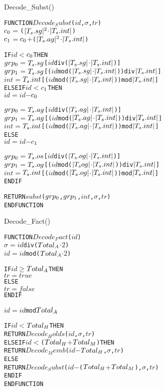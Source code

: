 \documentclass[11pt]{report}
\newenvironment{vverbatim}
{
  \begin{alltt}
}
{
    \vspace{-\baselineskip}
  \end{alltt}
}
\newlength{\valgorithmboxwidth}
\newenvironment{valgorithm}[3][tbhp]
{
  \setlength{\valgorithmboxwidth}{\linewidth-2em}

  \begin{valgorithmfloat}[#1]
    \caption{#2}
    \label{#3}
    \hspace{1em}
    \begin{lrbox}{\valgorithmbox}
      \begin{minipage}[l]{\valgorithmboxwidth}
        \small
        \begin{vverbatim}
}
{
        \end{vverbatim}
      \end{minipage}
    \end{lrbox}
    \framebox[\valgorithmboxwidth][l]{\usebox{\valgorithmbox}}
  \end{valgorithmfloat}
}
\begin{document}
        \begin{valgorithm}[tbhp]{Decode\_Subst()}{algo-decode-subst}
FUNCTION \(Decode_Subst\)(\(id\), \(\sigma\), \(tr\))
  \(c\sb{0}\) \(=\) (\(|T\sb{s}.sg|\sp{2}\) \(\cdot\) \(|T\sb{s}.int|\)) 
  \(c\sb{1}\) \(=\) \(c\sb{0}\) \(+\) (\(|T\sb{s}.ag|\sp{2}\) \(\cdot\) \(|T\sb{s}.int|\)) 

  IF \(id\) \(<\) \(c\sb{0}\) THEN
    \(grp\sb{0}\) \(=\) \(T\sb{s}.sg\)[\(id\) div (\(|T\sb{s}.sg|\) \(\cdot\) \(|T\sb{s}.int|\))]
    \(grp\sb{1}\) \(=\) \(T\sb{s}.sg\)[(\(id\) mod (\(|T\sb{s}.sg|\) \(\cdot\) \(|T\sb{s}.int|\))) div \(|T\sb{s}.int|\)]
    \(int\) \(=\) \(T\sb{s}.int\)[(\(id\) mod (\(|T\sb{s}.sg|\) \(\cdot\) \(|T\sb{s}.int|\))) mod \(|T\sb{s}.int|\)]
  ELSE IF \(id\) \(<\) \(c\sb{1}\) THEN
    \(id\) \(=\) \(id\) \(-\) \(c\sb{0}\)

    \(grp\sb{0}\) \(=\) \(T\sb{s}.ag\)[\(id\) div (\(|T\sb{s}.ag|\) \(\cdot\) \(|T\sb{s}.int|\))]
    \(grp\sb{1}\) \(=\) \(T\sb{s}.ag\)[(\(id\) mod (\(|T\sb{s}.ag|\) \(\cdot\) \(|T\sb{s}.int|\))) div \(|T\sb{s}.int|\)]
    \(int\) \(=\) \(T\sb{s}.int\)[(\(id\) mod (\(|T\sb{s}.ag|\) \(\cdot\) \(|T\sb{s}.int|\))) mod \(|T\sb{s}.int|\)]
  ELSE
    \(id\) \(=\) \(id\) \(-\) \(c\sb{1}\)

    \(grp\sb{0}\) \(=\) \(T\sb{s}.os\)[\(id\) div (\(|T\sb{s}.og|\) \(\cdot\) \(|T\sb{s}.int|\))]
    \(grp\sb{1}\) \(=\) \(T\sb{s}.og\)[(\(id\) mod (\(|T\sb{s}og|\) \(\cdot\) \(|T\sb{s}.int|\))) div \(|T\sb{s}.int|\)]
    \(int\) \(=\) \(T\sb{s}.int\)[(\(id\) mod (\(|T\sb{s}.og|\) \(\cdot\) \(|T\sb{s}.int|\))) mod \(|T\sb{s}.int|\)]
  ENDIF

  RETURN \(subst\)(\(grp\sb{0}\), \(grp\sb{1}\), \(int\), \(\sigma\), \(tr\))
ENDFUNCTION
        \end{valgorithm}

        \begin{valgorithm}[tbhp]{Decode\_Fact()}{algo-decode-fact}
FUNCTION \(Decode_Fact\)(\(id\))
  \(\sigma\) \(=\) \(id\) div (\(Total\sb{A}\) \(\cdot\) \(2\))
  \(id\) \(=\) \(id\) mod (\(Total\sb{A}\) \(\cdot\) \(2\)) 

  IF \(id\) \(\geq\) \(Total\sb{A}\) THEN
    \(tr\) \(=\) \(true\)
  ELSE
    \(tr\) \(=\) \(false\)
  ENDIF

  \(id\) \(=\) \(id\) mod \(Total\sb{A}\)

  IF \(id\) \(<\) \(Total\sb{H}\) THEN
    RETURN \(Decode_Holds\)(\(id\), \(\sigma\), \(tr\))
  ELSEIF \(id\) \(<\) (\(Total\sb{H}\) \(+\) \(Total\sb{M}\)) THEN
    RETURN \(Decode_Memb\)(\(id\) \(-\) \(Total\sb{H}\), \(\sigma\), \(tr\))
  ELSE
    RETURN \(Decode_Subst\)(\(id\) \(-\) (\(Total\sb{H}\) \(+\) \(Total\sb{M}\)), \(\sigma\), \(tr\))
  ENDIF
ENDFUNCTION
        \end{valgorithm}
\end{document}

